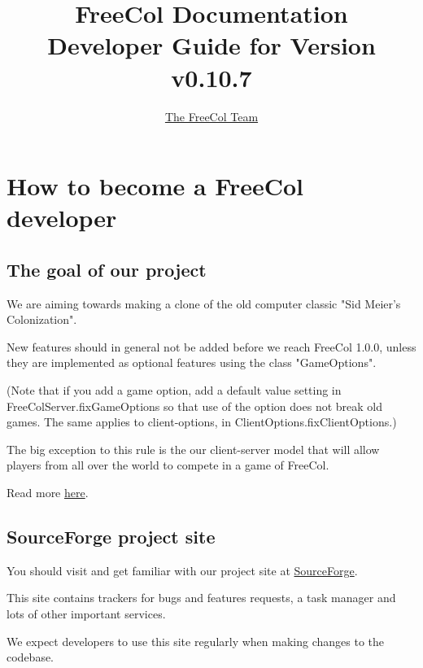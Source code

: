 \documentclass[12pt]{book}
\begin{document}
\author{\href{http://www.freecol.org/team-and-credits.html}{The FreeCol Team}}
\title{FreeCol Documentation\\Developer Guide for Version v0.10.7}
\maketitle{}

\tableofcontents
\newpage


\hypertarget{How to become a FreeCol developer}
            {\chapter{How to become a FreeCol developer}}


\hypertarget{The goal of our project}{\section{The goal of our project}}

We are aiming towards making a clone of the old computer
classic "Sid Meier's Colonization".

New features should in general not be added before we reach
FreeCol 1.0.0, unless they are implemented as optional features
using the class "GameOptions".

(Note that if you add a game option, add a default value setting in
FreeColServer.fixGameOptions so that use of the option does not break
old games.  The same applies to client-options,
in ClientOptions.fixClientOptions.)

The big exception to this rule is the our client-server model that
will allow players from all over the world to compete in a game
of FreeCol.

Read more \href{http://www.freecol.org/about.html}{here}.


\hypertarget{SourceForge project site}{\section{SourceForge project site}}

You should visit and get familiar with our project site at
\href{https://sourceforge.net/projects/freecol/}{SourceForge}.

This site contains trackers for bugs and features requests,
a task manager and lots of other important services.

We expect developers to use this site regularly when making
changes to the codebase.
\end{document}
